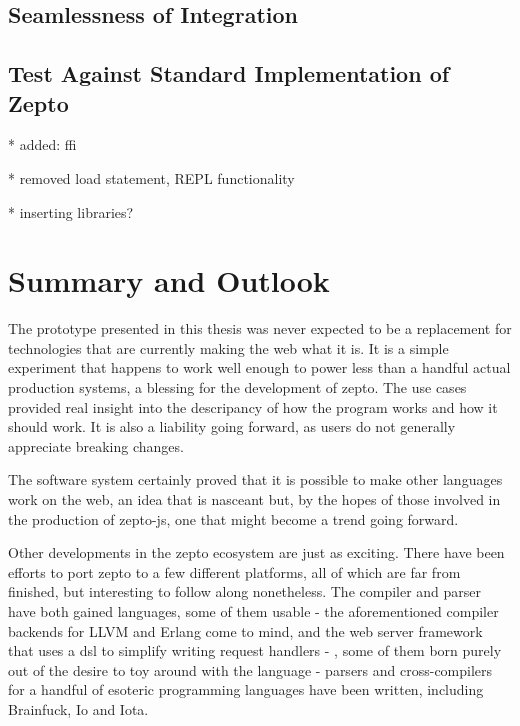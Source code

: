 \documentclass[oneside,11pt,xetex]{scrbook}
\begin{document}
\section{Seamlessness of Integration}

\section{Test Against Standard Implementation of Zepto}

* added: ffi

* removed load statement, REPL functionality

* inserting libraries?

\chapter{Summary and Outlook}
\label{chap:outlook}

The prototype presented in this thesis was never expected to be a replacement
for technologies that are currently making the web what it is. It is a simple
experiment that happens to work well enough to power less than a handful
actual production systems, a blessing for the development of zepto. The
use cases provided real insight into the descripancy of how the program
works and how it should work. It is also a liability going forward, as users
do not generally appreciate breaking changes.

The software system certainly proved that it is possible to make other
languages work on the web, an idea that is nasceant but, by the hopes of
those involved in the production of zepto-js, one that might become a trend
going forward.

Other developments in the zepto ecosystem are just as exciting. There have
been efforts to port zepto to a few different platforms, all of which are
far from finished, but interesting to follow along nonetheless. The compiler
and parser have both gained languages, some of them usable - the aforementioned
compiler backends for LLVM and Erlang come to mind, and the web server framework
that uses a \gls{dsl} to simplify writing request handlers - , some of them born
purely out of the desire to toy around with the language - parsers and cross-compilers
for a handful of esoteric programming languages have been written, including Brainfuck,
Io and Iota.
\end{document}

